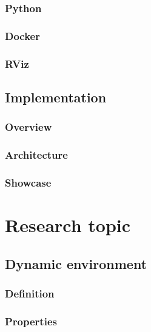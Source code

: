 \documentclass[12pt, a4paper]{report}
\begin{document}
      \subsection{Python}
      
      \newpage
      \subsection{Docker}
      
      \subsection{RViz}
      
    \section{Implementation}
    
      \subsection{Overview}
      
      \newpage
      \subsection{Architecture}
      
      \subsection{Showcase}
      

  \chapter{Research topic}
    
    \section{Dynamic environment}
    
      \subsection{Definition}
      
      \subsection{Properties}
      
      \newpage
\end{document}
